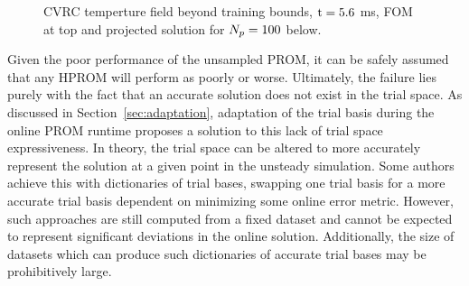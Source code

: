 \begin{figure}
	\begin{minipage}{0.99\linewidth}
	\end{minipage}
    \begin{minipage}{0.99\linewidth}
	\end{minipage}
    \caption{\label{fig:cvrcStaticTempProjSlice}CVRC temperture field beyond training bounds, $\text{t} = 5.6$ ms, FOM at top and projected solution for $N_p = 100$ below.}
\end{figure}

Given the poor performance of the unsampled PROM, it can be safely assumed that any HPROM will perform as poorly or worse. Ultimately, the failure lies purely with the fact that an accurate solution does not exist in the trial space. As discussed in Section~\ref{sec:adaptation}, adaptation of the trial basis during the online PROM runtime proposes a solution to this lack of trial space expressiveness. In theory, the trial space can be altered to more accurately represent the solution at a given point in the unsteady simulation. Some authors~\cite{Abgrall2016,Grimberg2021} achieve this with dictionaries of trial bases, swapping one trial basis for a more accurate trial basis dependent on minimizing some online error metric. However, such approaches are still computed from a fixed dataset and cannot be expected to represent significant deviations in the online solution. Additionally, the size of datasets which can produce such dictionaries of accurate trial bases may be prohibitively large.

